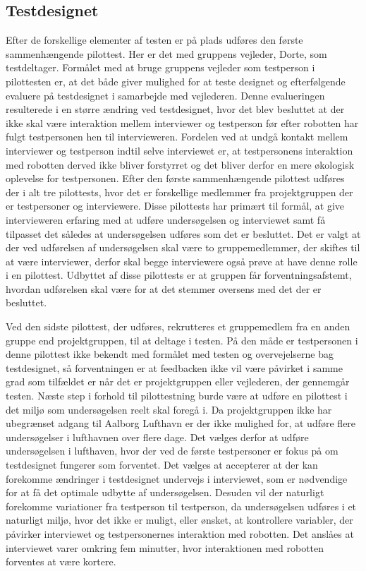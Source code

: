 \subsection{Testdesignet}
\label{ParametrePilotTestdesign}
%
Efter de forskellige elementer af testen er på plads udføres den første sammenhængende pilottest. Her er det med gruppens vejleder, Dorte, som testdeltager. Formålet med at bruge gruppens vejleder som testperson i pilottesten er, at det både giver mulighed for at teste designet og efterfølgende evaluere på testdesignet i samarbejde med vejlederen. Denne evalueringen resulterede i en større ændring ved testdesignet, hvor det blev besluttet at der ikke skal være interaktion mellem interviewer og testperson før efter robotten har fulgt testpersonen hen til intervieweren. Fordelen ved at undgå kontakt mellem interviewer og testperson indtil selve interviewet er, at testpersonens interaktion med robotten derved ikke bliver forstyrret og det bliver derfor en mere økologisk oplevelse for testpersonen. \blankline
%
Efter den første sammenhængende pilottest udføres der i alt tre pilottests, hvor det er forskellige medlemmer fra projektgruppen der er testpersoner og interviewere. Disse pilottests har primært til formål, at give intervieweren erfaring med at udføre undersøgelsen og interviewet samt få tilpasset det således at undersøgelsen udføres som det er besluttet. Det er valgt at der ved udførelsen af undersøgelsen skal være to gruppemedlemmer, der skiftes til at være interviewer, derfor skal begge interviewere også prøve at have denne rolle i en pilottest. Udbyttet af disse pilottests er at gruppen får forventningsafstemt, hvordan udførelsen skal være for at det stemmer oversens med det der er besluttet.

Ved den sidste pilottest, der udføres, rekrutteres et gruppemedlem fra en anden gruppe end projektgruppen, til at deltage i testen. På den måde er testpersonen i denne pilottest ikke bekendt med formålet med testen og overvejelserne bag testdesignet, så forventningen er at feedbacken ikke vil være påvirket i samme grad som tilfældet er når det er projektgruppen eller vejlederen, der gennemgår testen. \blankline
%
Næste step i forhold til pilottestning burde være at udføre en pilottest i det miljø som undersøgelsen reelt skal foregå i. Da projektgruppen ikke har ubegrænset adgang til Aalborg Lufthavn er der ikke mulighed for, at udføre flere undersøgelser i lufthavnen over flere dage. Det vælges derfor at udføre undersøgelsen i lufthaven, hvor der ved de første testpersoner er fokus på om testdesignet fungerer som forventet. Det vælges at accepterer at der kan forekomme ændringer i testdesignet undervejs i interviewet, som er nødvendige for at få det optimale udbytte af undersøgelsen. Desuden vil der naturligt forekomme variationer fra testperson til testperson, da undersøgelsen udføres i et naturligt miljø, hvor det ikke er muligt, eller ønsket, at kontrollere variabler, der påvirker interviewet og testpersonernes interaktion med robotten. Det anslåes at interviewet varer omkring fem minutter, hvor interaktionen med robotten forventes at være kortere. 
